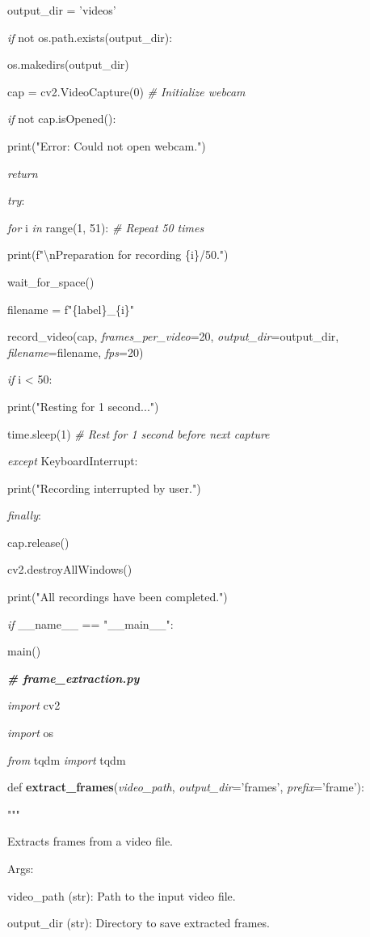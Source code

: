 \documentclass[
]{article}
\begin{document}
output\_dir = 'videos'

\emph{if} not os.path.exists(output\_dir):

os.makedirs(output\_dir)

cap = cv2.VideoCapture(0) \emph{\# Initialize webcam}

\emph{if} not cap.isOpened():

print("Error: Could not open webcam.")

\emph{return}

\emph{try}:

\emph{for} i \emph{in} range(1, 51): \emph{\# Repeat 50 times}

print(f"\textbackslash nPreparation for recording \{i\}/50.")

wait\_for\_space()

filename = f"\{label\}\_\{i\}"

record\_video(cap, \emph{frames\_per\_video}=20, \emph{output\_dir}=output\_dir, \emph{filename}=filename, \emph{fps}=20)

\emph{if} i \textless{} 50:

print("Resting for 1 second...")

time.sleep(1) \emph{\# Rest for 1 second before next capture}

\emph{except} KeyboardInterrupt:

print("Recording interrupted by user.")

\emph{finally}:

cap.release()

cv2.destroyAllWindows()

print("All recordings have been completed.")

\emph{if} \_\_name\_\_ == "\_\_main\_\_":

main()

\emph{\textbf{\# frame\_extraction.py}}

\emph{import} cv2

\emph{import} os

\emph{from} tqdm \emph{import} tqdm

def \textbf{extract\_frames}(\emph{video\_path}, \emph{output\_dir}='frames', \emph{prefix}='frame'):

"""

Extracts frames from a video file.

Args:

video\_path (str): Path to the input video file.

output\_dir (str): Directory to save extracted frames.
\end{document}
